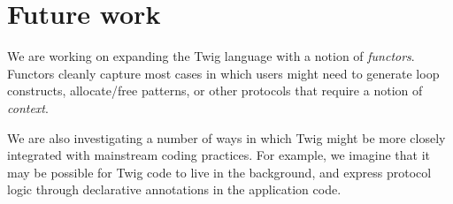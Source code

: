 
\section{Future work}
\label{sec:future-work}

We are working on expanding the Twig language with a notion of \emph{functors}. Functors cleanly capture most cases in which users might need to generate loop constructs, allocate/free patterns, or other protocols that require a notion of \emph{context}.

We are also investigating a number of ways in which Twig might be more closely integrated with mainstream coding practices. For example, we imagine that it may be possible for Twig code to live in the background, and express protocol logic through declarative annotations in the application code.
